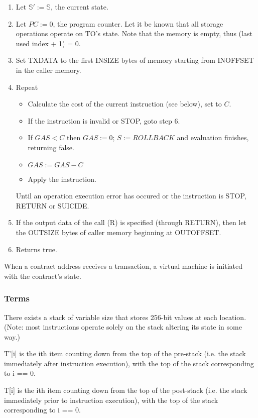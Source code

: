 \documentclass[9pt,oneside]{amsart}
\begin{document}
\begin{multicols}{2}
\begin{enumerate}
\item Let $\mathbb{S}' := \mathbb{S}$, the current state.
\item Let $PC := 0$, the program counter.
Let it be known that all storage operations operate on TO's state.
Note that the memory is empty, thus (last used index + 1) = 0.
\item Set TXDATA to the first INSIZE bytes of memory starting from INOFFSET in the caller memory.
\item Repeat
\begin{itemize}
\item Calculate the cost of the current instruction (see below), set to $C$.
\item If the instruction is invalid or STOP, goto step 6.
\item If $GAS < C$ then $GAS := 0$; $S := ROLLBACK$ and evaluation finishes, returning false. 
\item $GAS := GAS - C$
\item Apply the instruction.
\end{itemize}
Until an operation execution error has occured or the instruction is STOP, RETURN or SUICIDE.
\item If the output data of the call (R) is specified (through RETURN), then let the OUTSIZE bytes of caller memory beginning at OUTOFFSET.
\item Returns true.
\end{enumerate}



When a contract address receives a transaction, a virtual machine is initiated with the contract's state.

\subsubsection{Terms}

There exists a stack of variable size that stores 256-bit values at each location. (Note: most instructions operate solely on the stack altering its state in some way.)

T'[i] is the ith item counting down from the top of the pre-stack (i.e. the stack immediately after instruction execution), with the top of the stack corresponding to i == 0.

T[i] is the ith item counting down from the top of the post-stack (i.e. the stack immediately prior to instruction execution), with the top of the stack corresponding to i == 0.



\end{multicols}
\end{document}
